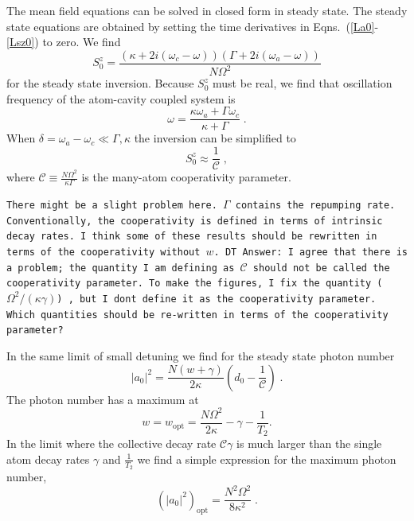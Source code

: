 \documentclass[aps,
twocolumn,
showpacs,
superscriptaddress,groupedaddress]{revtex4}
\newcommand{\dmcomment}[1]{{\tt #1}}
\begin{document}
The mean field equations can be solved in closed form in steady state.
The steady state equations are obtained by setting the time derivatives
in Eqns.~(\ref{La0}-\ref{Lsz0}) to zero.  We find
\begin{equation}
S_0^{z}=
\frac{(\kappa+2i(\omega_c-\omega))(\Gamma+2i(\omega_a-\omega))}{N\Omega^2}
\label{Sz01}
\end{equation}
for the steady state inversion.  Because $S_0^{z}$ must be real,
we find that oscillation frequency of the atom-cavity coupled system is
\begin{equation}
\omega = \frac{\kappa \omega_a + \Gamma \omega_c}{\kappa+\Gamma}\;.
\label{atomcavityfrequencycenter1}
\end{equation}
When $\delta = \omega_a-\omega_c \ll \Gamma,\kappa$ the inversion can be
simplified to
\begin{equation}
S_0^{z}\approx \frac{1}{\mathcal{C}}\;,
\end{equation}
where $\mathcal{C}\equiv \frac{N \Omega^2}{\kappa \Gamma}$ is the
many-atom cooperativity parameter.

\dmcomment{There might be a slight problem here.  $\Gamma$ contains the
repumping rate.  Conventionally, the cooperativity is defined in terms
of intrinsic decay rates.  I think some of these results should be
rewritten in terms of the cooperativity without $w$. DT Answer: I agree that there is a problem; the quantity I am defining as $\mathcal{C}$ should not be called the cooperativity parameter. To make the figures, I fix the quantity ($\Omega^2/(\kappa \gamma)$) , but I dont define it as the cooperativity parameter. Which quantities should be re-written in terms of the cooperativity parameter?}

In the same limit of small detuning we find for the steady state photon
number
\begin{equation}
|a_0|^2=\frac{N(w+\gamma)}{2 \kappa} (d_0 - \frac{1}{\mathcal{C}})\;.
\label{a0sqSS}
\end{equation}
The photon number has a maximum at
\begin{equation}
w=w_{\mathrm{opt}} = \frac{N \Omega^2}{2\kappa} - \gamma - \frac{1}{T_2}.
\label{wopt}
\end{equation}
In the limit where the collective decay rate $\mathcal{C}\gamma$ is much
larger than the single atom decay rates $\gamma$ and $\frac{1}{T_2}$ we
find a simple expression for the maximum photon number,
\begin{equation}
(|a_0|^2)_{\mathrm{opt}}= \frac{N^2 \Omega^2}{8\kappa^2}\;.
\label{adaopt}
\end{equation}
\end{document}
